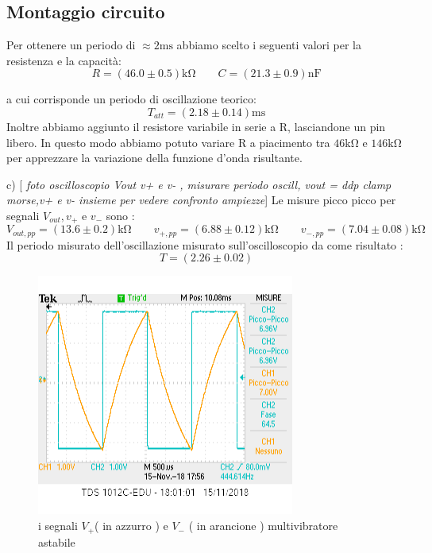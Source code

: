 \documentclass[10pt,a4paper]{article}
\newcommand{\rem}[1]{[\emph{#1}]}
\begin{document}
\subsection{Montaggio circuito}
Per ottenere un periodo di $\approx 2 \si{\milli\second}$ abbiamo scelto i seguenti valori per la resistenza e la capacità:
\[ R = ( 46.0 \pm0.5 )\si{\kilo\ohm} \qquad   C = (21.3\pm0.9 )\si{\nano \farad}\]

a cui corrisponde un periodo di oscillazione teorico:
\[T_{att}= (2.18\pm 0.14 )\si{\milli \second}\]
Inoltre abbiamo aggiunto il resistore variabile in serie a R, lasciandone un pin libero. In questo modo abbiamo potuto variare R a piacimento tra $46 \si{\kilo\ohm}$ e $146 \si{\kilo\ohm}$ per apprezzare la variazione della funzione d'onda risultante.



c) \rem{ foto oscilloscopio Vout v+ e v- , misurare periodo oscill,  vout = ddp clamp morse,v+ e v- insieme per vedere confronto ampiezze}
Le misure picco picco per  segnali  $V_{out}, v_{+}$ e $v_{-}$ sono :
\[ V_{out,pp}= (13.6\pm 0.2)\si{\kilo\ohm} \qquad  v_{+,pp}= (6.88 \pm 0.12)\si{\kilo\ohm} \qquad   v_{-,pp}= ( 7.04 \pm0.08 ) \si{\kilo\ohm}\]
Il periodo misurato dell'oscillazione misurato sull'oscilloscopio da come risultato :
\[ T = (2.26 \pm 0.02)\]




\begin{figure}[h]
	\begin{center}
		
			\includegraphics[scale=0.8]{v+_v-.png}
		\caption{\small i segnali $V_+$( in azzurro ) e $ V_-$ ( in arancione )  multivibratore astabile}

		\label{fig:v+v-}
	\end{center}

\end{figure}
\end{document}
